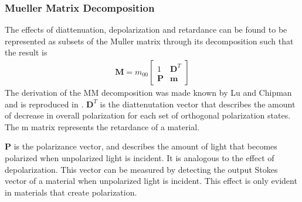 \subsubsection{Mueller Matrix Decomposition}

The effects of diattenuation, depolarization and retardance can be found to be represented as subsets of the Muller matrix through its decomposition such that the result is
\begin{align}
    \mathbf{M} = m_{00}
    \begin{bmatrix}
        1 & \mathbf{D}^T \\
        \mathbf{P} & \mathbf{m}
    \end{bmatrix}
\end{align}
The derivation of the MM decomposition was made known by Lu and Chipman and is reproduced in \cite{polarizedlight}. $\mathbf{D}^T$ is the diattenutation vector that describes the amount of decrease in overall polarization for each set of orthogonal polarization states. The m matrix represents the retardance of a material.

$\mathbf{P}$ is the polarizance vector, and describes the amount of light that becomes polarized when unpolarized light is incident.  It is analogous to the effect of depolarization.  This vector can be measured by detecting the output Stokes vector of a material when unpolarized light is incident.  This effect is only evident in materials that create polarization.
